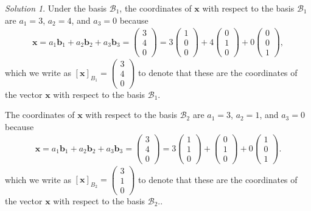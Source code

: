 \documentclass[
]{book}
\theoremstyle{definition}
\theoremstyle{definition}
\theoremstyle{definition}
\theoremstyle{remark}
\newtheorem*{solution}{Solution}
\begin{document}
\begin{solution}

Under the basis \(\mathcal{B}_1\), the coordinates of \(\mathbf{x}\) with respect to the basis \(\mathcal{B}_1\) are \(a_1 = 3\), \(a_2 = 4\), and \(a_3 = 0\) because
\[
\begin{aligned}
\mathbf{x} = a_1 \mathbf{b}_1 + a_2 \mathbf{b}_2 + a_3 \mathbf{b}_3 =  \begin{pmatrix} 3 \\ 4 \\ 0 \end{pmatrix} = 3 \begin{pmatrix} 1 \\ 0 \\ 0 \end{pmatrix} + 4 \begin{pmatrix} 0 \\ 1 \\ 0 \end{pmatrix} + 0 \begin{pmatrix} 0 \\ 0 \\ 1 \end{pmatrix},
\end{aligned}
\]
which we write as \([\mathbf{x}]_{B_1} = \begin{pmatrix} 3 \\ 4 \\ 0 \end{pmatrix}\) to denote that these are the coordinates of the vector \(\mathbf{x}\) with respect to the basis \(\mathcal{B}_1\).

The coordinates of \(\mathbf{x}\) with respect to the basis \(\mathcal{B}_2\) are \(a_1 = 3\), \(a_2 = 1\), and \(a_3 = 0\) because
\[
\begin{aligned}
\mathbf{x} = a_1 \mathbf{b}_1 + a_2 \mathbf{b}_2 + a_3 \mathbf{b}_3 = \begin{pmatrix} 3 \\ 4 \\ 0 \end{pmatrix} = 3 \begin{pmatrix} 1 \\ 1 \\ 0 \end{pmatrix} + \begin{pmatrix} 0 \\ 1 \\ 0 \end{pmatrix} + 0 \begin{pmatrix} 1 \\ 0 \\ 1 \end{pmatrix}.
\end{aligned}
\]
which we write as \([\mathbf{x}]_{B_2} = \begin{pmatrix} 3 \\ 1 \\ 0 \end{pmatrix}\) to denote that these are the coordinates of the vector \(\mathbf{x}\) with respect to the basis \(\mathcal{B}_2\)..


\end{solution}
\end{document}
